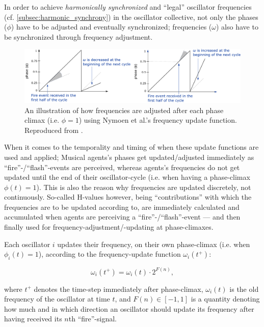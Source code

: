	In order to achieve \textit{harmonically synchronized} and ``legal'' oscillator frequencies (cf. \ref{subsec:harmonic_synchrony}) in the oscillator collective, not only the phases ($\phi$) have to be adjusted and eventually synchronized; frequencies ($\omega$) also have to be synchronized through frequency adjustment.
	
	\begin{figure}[ht!]
		\centering
		\includegraphics[width=\linewidth]{Assets/DocSegments/Chapters/Baseline/Figures/Illustrations/NymoenFrequencyAdjustment.pdf}
		\caption[]{An illustration of how frequencies are adjusted after each phase climax (i.e. $\phi=1$) using Nymoen et al.'s frequency update function. Reproduced from \cite{nymoen_synch}.}
		\label{fig:nymoen_freq_adjust_illustration}
	\end{figure}
	
	
	When it comes to the temporality and timing of when these update functions are used and applied; Musical agents's phases get updated/adjusted immediately as ``fire''-/``flash''-events are perceived, whereas agents's frequencies do not get updated until the end of their oscillator-cycle (i.e. when having a phase-climax $\phi(t)=1$). This is also the reason why frequencies are updated discretely, not continuously. So-called H-values however, being ``contributions'' with which the frequencies are to be updated according to, are immediately calculated and accumulated when agents are perceiving a ``fire''-/``flash''-event — and then finally used for frequency-adjustment/-updating at phase-climaxes.
	
	Each oscillator $i$ updates their frequency, on their own phase-climax (i.e. when $\phi_i(t)=1$), according to the frequency-update function $\omega_i(t^+)$:

	\begin{equation}
		\omega_i(t^+) = \omega_i(t) \cdot 2^{F(n)},
	\end{equation}

	where $t^+$ denotes the time-step immediately after phase-climax, $\omega_i(t)$ is the old frequency of the oscillator at time $t$, and $F(n) \in [-1,1]$ is a quantity denoting how much and in which direction an oscillator should update its frequency after having received its $n$th ``fire''-signal.

